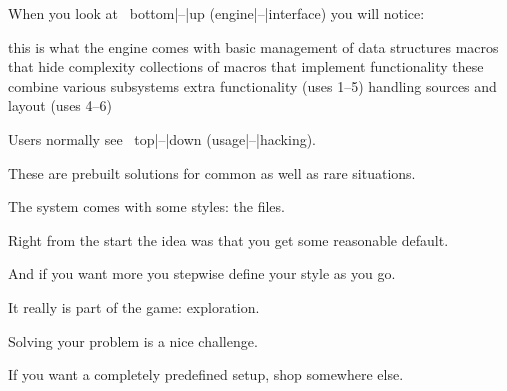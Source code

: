 


\startdocument
  [title={PROGRAMMING},
   banner={the way \CONTEXT\ is set up},
   location={context\enspace {\bf 2021}\enspace meeting}]

\starttitle[title=Levels]

When you look at \CONTEXT\ bottom|--|up (engine|--|interface) you will notice: \blank[2*big]

\startnarrower

\startitemize[n]

\startitem
     this is what the engine comes with
\stopitem
\startitem
     basic management of data structures
\stopitem
\startitem
     macros that hide complexity
\stopitem
\startitem
     collections of macros that implement functionality
\stopitem
\startitem
     these combine various subsystems
\stopitem
\startitem
     extra functionality (uses 1--5)
\stopitem
\startitem
     handling sources and layout (uses 4--6)
\stopitem

\stopitemize

\stopnarrower

\blank[2*big] Users normally see \CONTEXT\ top|--|down (usage|--|hacking).

\stoptitle


\starttitle[title=Styles]

\startitemize

\startitem
    These are prebuilt solutions for common as well as rare situations.
\stopitem

\startitem
    The system comes with some styles: the  files.
\stopitem

\startitem
    Right from the start the idea was that you get some reasonable default.
\stopitem

\startitem
    And if you want more you stepwise define your style as you go.
\stopitem

\startitem
    It really is part of the game: exploration.
\stopitem

\startitem
    Solving your problem is a nice challenge.
\stopitem

\startitem
    If you want a completely predefined setup, shop somewhere else.
\stopitem

